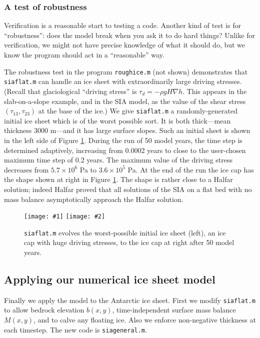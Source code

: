 \documentclass[titlepage,a4paper,final,12pt]{scrartcl}
\newcommand{\grad}{\nabla}
\newcommand{\twofigsizes}[5]{
\begin{figure}[ht]
\centering
\texttt{[image: \#1]} \quad
\texttt{[image: \#2]}
\caption{#3}
\label{fig:#1}
\end{figure}}
\newcommand{\twofig}[3]{\twofigsizes{#1}{#2}{#3}{2.5in}{2.5in}}
\begin{document}
\subsubsection*{A test of robustness}  Verification is a reasonable start to testing a code.  Another kind of test is for ``robustness'': does the model break when you ask it to do hard things?  Unlike for verification, we might not have precise knowledge of what it should do, but we know the program should act in a ``reasonable'' way.

The robustness test in the program \texttt{roughice.m} (not shown) demonstrates that \texttt{siaflat.m} can handle an ice sheet with extraordinarily large driving stresses.  (Recall that glaciological ``driving stress'' is $\tau_d = - \rho g H \grad h$.  This appears in the slab-on-a-slope example, and in the SIA model, as the value of the shear stress $(\tau_{13},\tau_{23})$ at the base of the ice.)  We give \texttt{siaflat.m} a randomly-generated initial ice sheet which is of the worst possible sort.  It is both thick---mean thickness 3000 m---and it has large surface slopes.  Such an initial sheet is shown in the left side of Figure \ref{fig:roughinitial}.  During the run of 50 model years, the time step is determined adaptively, increasing from 0.0002 years to close to the user-chosen maximum time step of 0.2 years.  The maximum value of the driving stress decreases from $5.7\times 10^6$ Pa to $3.6\times 10^5$ Pa.  At the end of the run the ice cap has the shape shown at right in Figure \ref{fig:roughinitial}.  The shape is rather close to a Halfar solution; indeed Halfar proved that all solutions of the SIA on a flat bed with no mass balance asymptotically approach the Halfar solution.

\twofig{roughinitial}{roughfinal}{\texttt{siaflat.m} evolves the worst-possible initial ice sheet (left), an ice cap with huge driving stresses, to the ice cap at right after 50 model years.}


\subsection{Applying our numerical ice sheet model}

Finally we apply the model to the Antarctic ice sheet.  First we modify \texttt{siaflat.m} to allow bedrock elevation $b(x,y)$, time-independent surface mass balance $M(x,y)$, and to calve any floating ice.  Also we enforce non-negative thickness at each timestep.  The new code is \texttt{siageneral.m}.
\end{document}
